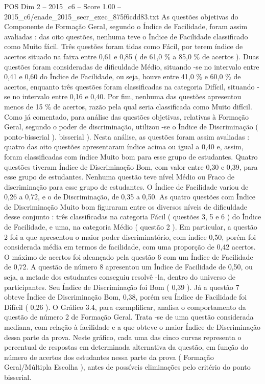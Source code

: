 \begin{textsample}{POS Dim 2 – 2015\_c6 – Score 1.00 – 2015\_c6/enade\_2015\_secr\_exec\_875f6cdd83.txt}
As questões objetivas do Componente de Formação Geral, segundo o Índice de Facilidade, foram assim avaliadas : das oito questões, nenhuma teve o Índice de Facilidade classificado como Muito fácil.
Três questões foram tidas como Fácil, por terem índice de acertos situado na faixa entre 0,61 e 0,85 ( de 61,0 \% a 85,0 \% de acertos ).
Duas questões foram consideradas de dificuldade Médio, situando -se no intervalo entre 0,41 e 0,60 do Índice de Facilidade, ou seja, houve entre 41,0 \% e 60,0 \% de acertos, enquanto três questões foram classificadas na categoria Difícil, situando -se no intervalo entre 0,16 e 0,40.
Por fim, nenhuma das questões apresentou menos de 15 \% de acertos, razão pela qual seria classificada como Muito difícil.
Como já comentado, para análise das questões objetivas, relativas à Formação Geral, segundo o poder de discriminação, utilizou -se o Índice de Discriminação ( ponto-bisserial ). bisserial ).
Nesta análise, as questões foram assim avaliadas : quatro das oito questões apresentaram índice acima ou igual a 0,40 e, assim, foram classificadas com índice Muito bom para esse grupo de estudantes.
Quatro questões tiveram Índice de Discriminação Bom, com valor entre 0,30 e 0,39, para esse grupo de estudantes.
Nenhuma questão teve nível Médio ou Fraco de discriminação para esse grupo de estudantes.
O Índice de Facilidade variou de 0,26 a 0,72, e o de Discriminação, de 0,35 a 0,50.
As quatro questões com Índice de Discriminação Muito bom figuraram entre os diversos níveis de dificuldade desse conjunto : três classificadas na categoria Fácil ( questões 3, 5 e 6 ) do Índice de Facilidade, e uma, na categoria Médio ( questão 2 ).
Em particular, a questão 2 foi a que apresentou o maior poder discriminatório, com índice 0,50, porém foi considerada média em termos de facilidade, com uma proporção de 0,42 acertos.
O máximo de acertos foi alcançado pela questão 6 com um Índice de Facilidade de 0,72.
A questão de número 8 apresentou um Índice de Facilidade de 0,50, ou seja, a metade dos estudantes conseguiu resolvê -la, dentro do universo de participantes.
Seu Índice de Discriminação foi Bom ( 0,39 ).
Já a questão 7 obteve Índice de Discriminação Bom, 0,38, porém seu Índice de Facilidade foi Difícil ( 0,26 ).
O Gráfico 3.4, para exemplificar, analisa o comportamento da questão de número 2 de Formação Geral.
Trata -se de uma questão considerada mediana, com relação à facilidade e a que obteve o maior Índice de Discriminação dessa parte da prova.
Neste gráfico, cada uma das cinco curvas representa o percentual de respostas em determinada alternativa da questão, em função do número de acertos dos estudantes nessa parte da prova ( Formação Geral/Múltipla Escolha ), antes de possíveis eliminações pelo critério do ponto bisserial.

\end{textsample}
